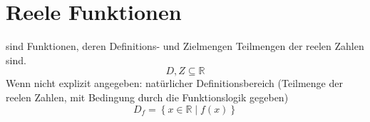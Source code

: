 

\section{Reele Funktionen}
\begin{definition}
     sind Funktionen, deren Definitions- und Zielmengen Teilmengen der reelen Zahlen sind.
    \begin{equation}
        D,Z \subseteq \mathbb{R} 
    \end{equation}
    Wenn nicht explizit angegeben: natürlicher Definitionsbereich (Teilmenge der reelen Zahlen, mit Bedingung durch die Funktionslogik gegeben)
    \begin{equation}
        D_f = \left\{x \in \mathbb{R} \mid f(x)\right\}
    \end{equation}
\end{definition}

